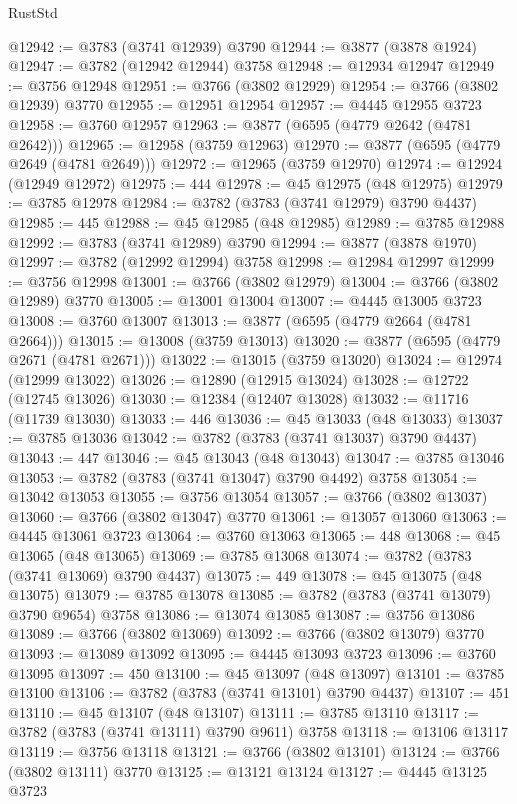 \begin{lexlean}{RustStd}
\begin{coremodule}
@12942 := @3783 (@3741 @12939) @3790
@12944 := @3877 (@3878 @1924)
@12947 := @3782 (@12942 @12944) @3758
@12948 := @12934 @12947
@12949 := @3756 @12948
@12951 := @3766 (@3802 @12929)
@12954 := @3766 (@3802 @12939) @3770
@12955 := @12951 @12954
@12957 := @4445 @12955 @3723
@12958 := @3760 @12957
@12963 := @3877 (@6595 (@4779 @2642 (@4781 @2642)))
@12965 := @12958 (@3759 @12963)
@12970 := @3877 (@6595 (@4779 @2649 (@4781 @2649)))
@12972 := @12965 (@3759 @12970)
@12974 := @12924 (@12949 @12972)
@12975 := 444
@12978 := @45 @12975 (@48 @12975)
@12979 := @3785 @12978
@12984 := @3782 (@3783 (@3741 @12979) @3790 @4437)
@12985 := 445
@12988 := @45 @12985 (@48 @12985)
@12989 := @3785 @12988
@12992 := @3783 (@3741 @12989) @3790
@12994 := @3877 (@3878 @1970)
@12997 := @3782 (@12992 @12994) @3758
@12998 := @12984 @12997
@12999 := @3756 @12998
@13001 := @3766 (@3802 @12979)
@13004 := @3766 (@3802 @12989) @3770
@13005 := @13001 @13004
@13007 := @4445 @13005 @3723
@13008 := @3760 @13007
@13013 := @3877 (@6595 (@4779 @2664 (@4781 @2664)))
@13015 := @13008 (@3759 @13013)
@13020 := @3877 (@6595 (@4779 @2671 (@4781 @2671)))
@13022 := @13015 (@3759 @13020)
@13024 := @12974 (@12999 @13022)
@13026 := @12890 (@12915 @13024)
@13028 := @12722 (@12745 @13026)
@13030 := @12384 (@12407 @13028)
@13032 := @11716 (@11739 @13030)
@13033 := 446
@13036 := @45 @13033 (@48 @13033)
@13037 := @3785 @13036
@13042 := @3782 (@3783 (@3741 @13037) @3790 @4437)
@13043 := 447
@13046 := @45 @13043 (@48 @13043)
@13047 := @3785 @13046
@13053 := @3782 (@3783 (@3741 @13047) @3790 @4492) @3758
@13054 := @13042 @13053
@13055 := @3756 @13054
@13057 := @3766 (@3802 @13037)
@13060 := @3766 (@3802 @13047) @3770
@13061 := @13057 @13060
@13063 := @4445 @13061 @3723
@13064 := @3760 @13063
@13065 := 448
@13068 := @45 @13065 (@48 @13065)
@13069 := @3785 @13068
@13074 := @3782 (@3783 (@3741 @13069) @3790 @4437)
@13075 := 449
@13078 := @45 @13075 (@48 @13075)
@13079 := @3785 @13078
@13085 := @3782 (@3783 (@3741 @13079) @3790 @9654) @3758
@13086 := @13074 @13085
@13087 := @3756 @13086
@13089 := @3766 (@3802 @13069)
@13092 := @3766 (@3802 @13079) @3770
@13093 := @13089 @13092
@13095 := @4445 @13093 @3723
@13096 := @3760 @13095
@13097 := 450
@13100 := @45 @13097 (@48 @13097)
@13101 := @3785 @13100
@13106 := @3782 (@3783 (@3741 @13101) @3790 @4437)
@13107 := 451
@13110 := @45 @13107 (@48 @13107)
@13111 := @3785 @13110
@13117 := @3782 (@3783 (@3741 @13111) @3790 @9611) @3758
@13118 := @13106 @13117
@13119 := @3756 @13118
@13121 := @3766 (@3802 @13101)
@13124 := @3766 (@3802 @13111) @3770
@13125 := @13121 @13124
@13127 := @4445 @13125 @3723

\end{coremodule}
\end{lexlean}
